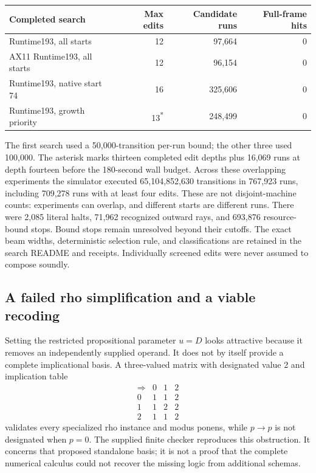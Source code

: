 \documentclass[11pt,letterpaper]{article}
\begin{document}
\begin{center}\small
\begin{tabular}{@{}p{}rrr@{}}
\toprule
Completed search & Max edits & Candidate runs & Full-frame hits\\
\midrule
Runtime193, all starts &12&97,664&0\\
AX11 Runtime193, all starts &12&96,154&0\\
Runtime193, native start 74 &16&325,606&0\\
Runtime193, growth priority &13\textsuperscript{*}&248,499&0\\
\bottomrule
\end{tabular}
\end{center}
The first search used a 50,000-transition per-run bound; the other three
used 100,000. The asterisk marks thirteen completed edit depths plus
16,069 runs at depth fourteen before the 180-second wall budget.
Across these overlapping experiments the simulator executed
65,104,852,630 transitions in 767,923 runs, including 709,278 runs with
at least four edits. These are not disjoint-machine counts: experiments
can overlap, and different starts are different runs. There were 2,085
literal halts, 71,962 recognized outward rays, and 693,876 resource-bound
stops. Bound stops remain unresolved beyond their cutoffs. The exact
beam widths, deterministic selection rule, and classifications are
retained in the search README and receipts. Individually screened edits
were never assumed to compose soundly.

\subsection{A failed rho simplification and a viable recoding}

Setting the restricted propositional parameter $u=D$ looks attractive
because it removes an independently supplied operand. It does not by
itself provide a complete implicational basis. A three-valued matrix with
designated value 2 and implication table
\[
\begin{array}{c|ccc}
 \Rightarrow&0&1&2\\\hline
 0&1&1&2\\
 1&1&2&2\\
 2&1&1&2
\end{array}
\]
validates every specialized rho instance and modus ponens, while
$p\to p$ is not designated when $p=0$. The supplied finite checker
reproduces this obstruction. It concerns that proposed standalone basis;
it is not a proof that the complete numerical calculus could not recover
the missing logic from additional schemas.
\end{document}
